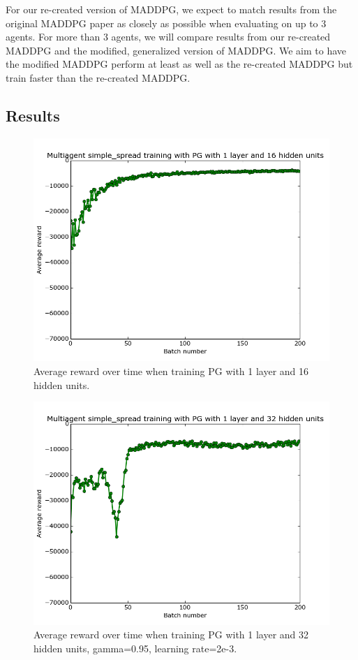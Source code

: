 \documentclass{article}
\begin{document}
For our re-created version of MADDPG, we expect to match results from the original MADDPG paper as closely as possible when evaluating on up to 3 agents. For more than 3 agents, we will compare results from our re-created MADDPG and the modified, generalized version of MADDPG. We aim to have the modified MADDPG perform at least as well as the re-created MADDPG but train faster than the re-created MADDPG.




\subsection{Results}

\begin{figure}
\centering
    \includegraphics[scale=0.25]{pg_1_16_gamma1}
    \caption{Average reward over time when training PG with 1 layer and 16 hidden units.}
\label{fig:pg_1_16_gamma1}
\end{figure}

\begin{figure}
\centering
    \includegraphics[scale=0.25]{pg_1_32_gamma95}
    \caption{Average reward over time when training PG with 1 layer and 32 hidden units, gamma=0.95, learning rate=2e-3.}
\label{fig:pg_1_32_gamma95}
\end{figure}
\end{document}
